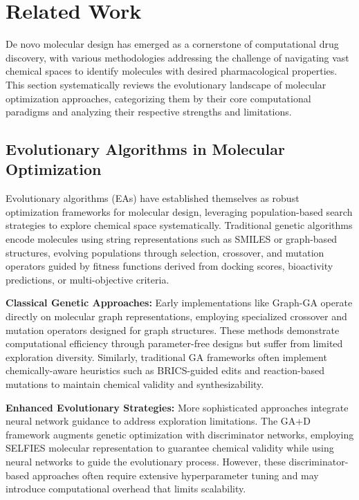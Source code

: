 \documentclass[lettersize,journal]{IEEEtran}
\begin{document}
\section{Related Work}

De novo molecular design has emerged as a cornerstone of computational drug discovery, with various methodologies addressing the challenge of navigating vast chemical spaces to identify molecules with desired pharmacological properties. This section systematically reviews the evolutionary landscape of molecular optimization approaches, categorizing them by their core computational paradigms and analyzing their respective strengths and limitations.

\subsection{Evolutionary Algorithms in Molecular Optimization}

Evolutionary algorithms (EAs) have established themselves as robust optimization frameworks for molecular design, leveraging population-based search strategies to explore chemical space systematically. Traditional genetic algorithms encode molecules using string representations such as SMILES or graph-based structures, evolving populations through selection, crossover, and mutation operators guided by fitness functions derived from docking scores, bioactivity predictions, or multi-objective criteria.

\noindent \textbf{Classical Genetic Approaches:} Early implementations like Graph-GA \cite{jensenGraphBasedGeneticAlgorithm2019} operate directly on molecular graph representations, employing specialized crossover and mutation operators designed for graph structures. These methods demonstrate computational efficiency through parameter-free designs but suffer from limited exploration diversity. Similarly, traditional GA frameworks often implement chemically-aware heuristics such as BRICS-guided edits and reaction-based mutations to maintain chemical validity and synthesizability.

\noindent \textbf{Enhanced Evolutionary Strategies:} More sophisticated approaches integrate neural network guidance to address exploration limitations. The GA+D framework \cite{nigamAugmentingGeneticAlgorithms2020} augments genetic optimization with discriminator networks, employing SELFIES molecular representation to guarantee chemical validity while using neural networks to guide the evolutionary process. However, these discriminator-based approaches often require extensive hyperparameter tuning and may introduce computational overhead that limits scalability.
\end{document}
